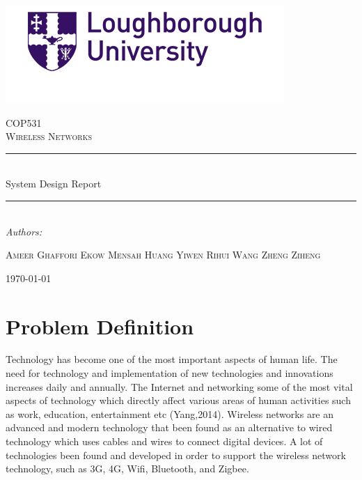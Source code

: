 \documentclass[a4paper]{article}
\begin{document}
\begin{titlepage}
		
	\center
	\includegraphics[scale=1]{logo}
	\newcommand{\HRule}{\rule{\linewidth}{0.5mm}}
		
	\textsc{\huge COP531}\\[0.5cm] 
 	\textsc{\huge Wireless Networks}\\[0.5cm]
 
	\HRule\\[0.4cm]

 	{\huge System Design Report}\\[0.4cm]

	\HRule\\[1.5cm]
	\huge\textit{Authors:}
	\begin{minipage}{0.4\textwidth}
 	\begin{center}
   		\large 
   		\textsc{Ameer Ghaffori}
   		\vfill
   		\textsc{Ekow Mensah}
   		\vfill
   		\textsc{Huang Yiwen}
   		\vfill
   		\textsc{Rihui Wang}
   		\vfill
   		\textsc{Zheng Ziheng}
 	\end{center}
 	\end{minipage}

	\vfill\vfill
	{\large\today}
	
\end{titlepage}
	
\newpage
	
\tableofcontents{}
	
\newpage 
	
\section{Problem Definition}
\onehalfspacing 
Technology has become one of the most important aspects of human life. The need for technology and implementation of new technologies and innovations increases daily and annually. The Internet and networking some of the most vital aspects of technology which directly affect various areas of human activities such as work, education, entertainment etc (Yang,2014). Wireless networks are an advanced and modern technology that been found as an alternative to wired technology which uses cables and wires to connect digital devices. A lot of technologies been found and developed in order to support the wireless network technology, such as 3G, 4G, Wifi, Bluetooth, and Zigbee. 
\end{document}
